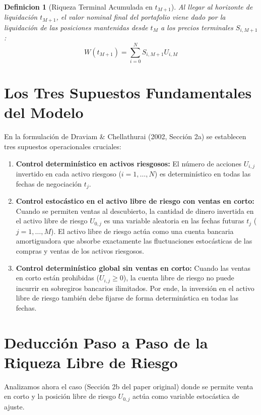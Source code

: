 \documentclass[11pt,a4paper]{report}
\newtheorem{definition}[theorem]{Definicion}
\numberwithin{equation}{chapter}
\begin{document}
\begin{definition}[Riqueza Terminal Acumulada en $t_{M+1}$]
Al llegar al horizonte de liquidación $t_{M+1}$, el valor nominal final del portafolio viene dado por la liquidación de las posiciones mantenidas desde $t_M$ a los precios terminales $S_{i,M+1}$:
\begin{equation}
    W(t_{M+1}) = \sum_{i=0}^N S_{i,M+1} U_{i,M} \label{eq:riqueza_terminal}
\end{equation}
\end{definition}

\section{Los Tres Supuestos Fundamentales del Modelo}

En la formulación de Draviam \& Chellathurai (2002, Sección 2a) se establecen tres supuestos operacionales cruciales:
\begin{enumerate}[label=(\alph*),leftmargin=2em]
    \item \textbf{Control determinístico en activos riesgosos:} El número de acciones $U_{i,j}$ invertido en cada activo riesgoso ($i=1,\dots,N$) es determinístico en todas las fechas de negociación $t_j$.
    \item \textbf{Control estocástico en el activo libre de riesgo con ventas en corto:} Cuando se permiten ventas al descubierto, la cantidad de dinero invertida en el activo libre de riesgo $U_{0,j}$ es una variable aleatoria en las fechas futuras $t_j$ ($j=1,\dots,M$). El activo libre de riesgo actúa como una cuenta bancaria amortiguadora que absorbe exactamente las fluctuaciones estocásticas de las compras y ventas de los activos riesgosos.
    \item \textbf{Control determinístico global sin ventas en corto:} Cuando las ventas en corto están prohibidas ($U_{i,j} \ge 0$), la cuenta libre de riesgo no puede incurrir en sobregiros bancarios ilimitados. Por ende, la inversión en el activo libre de riesgo también debe fijarse de forma determinística en todas las fechas.
\end{enumerate}

\section{Deducción Paso a Paso de la Riqueza Libre de Riesgo}

Analizamos ahora el caso (Sección 2b del paper original) donde se permite venta en corto y la posición libre de riesgo $U_{0,j}$ actúa como variable estocástica de ajuste.
\end{document}
